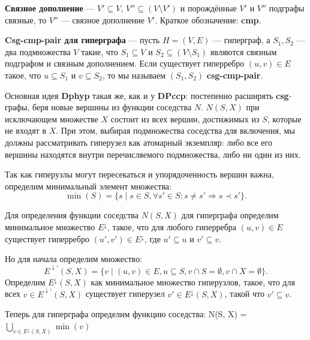 \documentclass[12pt]{article}
\begin{document}
\begin{flushleft}
\textbf{Связное дополнение} — $V' \subseteq V$, $V'' \subseteq (V \setminus V')$ и порождённые $V'$ и $V''$ подграфы связные, то $V''$ — связное дополнение $V'$. Краткое обозначение: \textbf{cmp}.

\textbf{Csg-cmp-pair для гиперграфа} — пусть $H = (V, E)$ — гиперграф, а $S_1, S_2$ — два подмножества $V$ такие, что $S_1 \subseteq V$ и $S_2 \subseteq (V \setminus S_1)$ являются связным подграфом и связным дополнением. Если существует гиперребро $(u, v) \in E$ такое, что $u \subseteq S_1$ и $v \subseteq S_2$, то мы называем $(S_1, S_2)$ \textbf{csg-cmp-pair}.

Основная идея \textbf{Dphyp} такая же, как и у \textbf{DPccp}: постепенно расширять \textbf{csg}-графы, беря новые вершины из функции соседства $N$. $N(S, X)$ при исключающем множестве $X$ состоит из всех вершин, достижимых из $S$, которые не входят в $X$. При этом, выбирая подмножества соседства для включения, мы должны рассматривать гиперузел как атомарный экземпляр: либо все его вершины находятся внутри перечисляемого подмножества, либо ни один из них.

Так как гиперузлы могут пересекаться и упорядоченность вершин важна, определим минимальный элемент множества:
\[
\min(S) = \{s \mid s \in S, \forall s' \in S: s \neq s' \Rightarrow s \prec s'\}.
\]

Для определения функции соседства $N(S, X)$ для гиперграфа определим минимальное множество $E^\downarrow$, такое, что для любого гиперребра $(u, v) \in E$ существует гиперребро $(u', v') \in E^\downarrow$, где $u' \subseteq u$ и $v' \subseteq v$.

Но для начала определим множество:
\[
E^{\downarrow'}(S, X) = \{v \mid (u, v) \in E, u \subseteq S, v \cap S = \emptyset, v \cap X = \emptyset\}.
\]
Определим $E^\downarrow (S, X)$ как минимальное множество гиперузлов, такое, что для всех $v \in E^{\downarrow'}(S, X)$ существует гиперузел $v' \in E^\downarrow (S, X)$, такой что $v' \subseteq v$.

Теперь для гиперграфа определим функцию соседства:
N(S, X) = $\bigcup_{v \in E^\downarrow (S, X)} \min(v)$


\end{flushleft}
\end{document}
